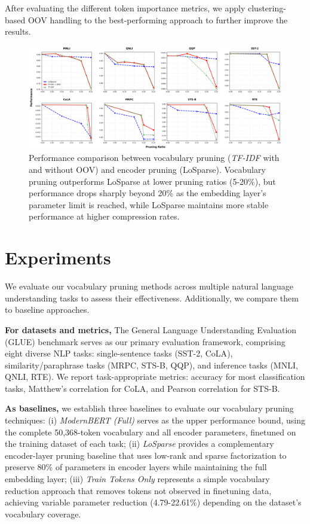 \documentclass[twocolumn]{article}
\begin{document}
After evaluating the different token importance metrics, we apply clustering-based OOV handling to the best-performing approach to further improve the results.

\begin{figure}[t]
    \centering
    \includegraphics[width=\linewidth]{images/pruning_ratios.png}
    \caption{Performance comparison between vocabulary pruning (\textit{TF-IDF} with and without OOV) and encoder pruning (LoSparse). Vocabulary pruning outperforms LoSparse at lower pruning ratios (5-20\%), but performance drops sharply beyond 20\% as the embedding layer's parameter limit is reached, while LoSparse maintains more stable performance at higher compression rates.}
    \label{fig:pruning_ratio}
\end{figure}

\section{Experiments}
We evaluate our vocabulary pruning methods across multiple natural language understanding tasks to assess their effectiveness. Additionally, we compare them to baseline approaches.

\textbf{For datasets and metrics,}
The General Language Understanding Evaluation (GLUE) benchmark\cite{wang2018glue} serves as our primary evaluation framework, comprising eight diverse NLP tasks: single-sentence tasks (SST-2\cite{socher2013recursive}, CoLA\cite{warstadt2019neural}), similarity/paraphrase tasks (MRPC\cite{dolan2005automatically}, STS-B\cite{cer2017semeval}, QQP\cite{qqp}), and inference tasks (MNLI\cite{williams2018broad}, QNLI\cite{rajpurkar2016squad}, RTE\cite{dagan2005pascal}). We report task-appropriate metrics: accuracy for most classification tasks, Matthew's correlation for CoLA, and Pearson correlation for STS-B. 


\textbf{As baselines,} 
we establish three baselines to evaluate our vocabulary pruning techniques: 
(i) \textit{ModernBERT (Full)} serves as the upper performance bound, using the complete 50,368-token vocabulary and all encoder parameters, finetuned on the training dataset of each task; 
(ii) \textit{LoSparse} provides a complementary encoder-layer pruning baseline that uses low-rank and sparse factorization to preserve 80\% of parameters in encoder layers while maintaining the full embedding layer; 
(iii) \textit{Train Tokens Only} represents a simple vocabulary reduction approach that removes tokens not observed in finetuning data, achieving variable parameter reduction (4.79-22.61\%) depending on the dataset's vocabulary coverage.
\end{document}
